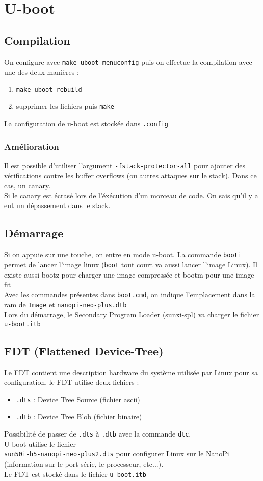 \section{U-boot}
\subsection{Compilation}
On configure avec \verb!make uboot-menuconfig! puis on effectue la compilation avec une des deux manières :
\begin{enumerate}
\item \verb!make uboot-rebuild!
\item supprimer les fichiers puis \verb!make!
\end{enumerate}
La configuration de u-boot est stockée dans \verb!.config!
\subsubsection{Amélioration}
Il est possible d'utiliser l'argument \verb!-fstack-protector-all! pour ajouter des vérifications contre les buffer overflows (ou autres attaques sur le stack). Dans ce cas, un canary.\\
Si le canary est écrasé lors de l'éxécution d'un morceau de code. On sais qu'il y a eut un dépassement dans le stack.
\subsection{Démarrage}
Si on appuie sur une touche, on entre en mode u-boot. La commande \verb!booti! permet de lancer l'image linux (\verb!boot! tout court va aussi lancer l'image Linux). Il existe aussi bootz pour charger une image compressée et bootm pour une image fit\\
Avec les commandes présentes dans \verb!boot.cmd!, on indique l'emplacement dans la ram de \verb!Image! et \verb!nanopi-neo-plus.dtb!\\
Lors du démarrage, le Secondary Program Loader (sunxi-spl) va charger le fichier \verb!u-boot.itb!
\subsection{FDT (Flattened Device-Tree)}
Le FDT contient une description hardware du système utilisée par Linux pour sa configuration. le FDT utilise deux fichiers :
\begin{itemize}
\item \verb!.dts! : Device Tree Source (fichier ascii)
\item \verb!.dtb! : Device Tree Blob (fichier binaire)
\end{itemize}
Possibilité de passer de \verb!.dts! à \verb!.dtb! avec la commande \verb!dtc!.\\
U-boot utilise le fichier \\\verb!sun50i-h5-nanopi-neo-plus2.dts! pour configurer Linux sur le NanoPi (information sur le port série, le processeur, etc...).\\
Le FDT est stocké dans le fichier \verb!u-boot.itb!
